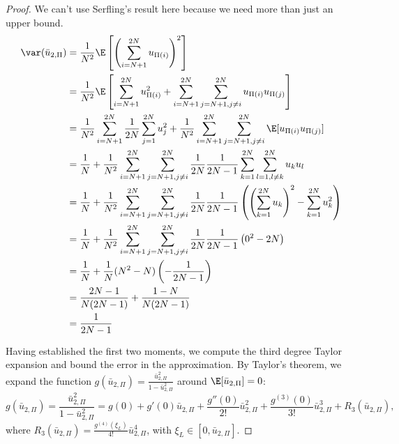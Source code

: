 \begin{proof}
  We can't use Serfling's result here because we need more than just an upper bound.
  \begin{align*}
    \var(\bar{u}_{2,\Pi})
    &= \frac{1}{N^2} \E \left [\left (\sum_{i=N+1}^{2N}u_{\Pi(i)}\right )^2\right ] \\
    &= \frac{1}{N^2} \E \left [\sum_{i=N+1}^{2N} u_{\Pi(i)}^2 +
    \sum_{i=N+1}^{2N}\sum_{j=N+1, j\neq i}^{2N}u_{\Pi(i)}u_{\Pi(j)} \right ] \\
    &= \frac{1}{N^2} \sum_{i=N+1}^{2N} \frac{1}{2N} \sum_{j=1}^{2N} u_{j}^2
    + \frac{1}{N^2}\sum_{i=N+1}^{2N}\sum_{j=N+1, j\neq
      i}^{2N} \E[u_{\Pi(i)} u_{\Pi(j)}] \\
    &= \frac{1}{N} + \frac{1}{N^2}\sum_{i=N+1}^{2N}\sum_{j=N+1, j\neq
      i}^{2N} \frac{1}{2N}\frac{1}{2N-1}\sum_{k=1}^{2N}
    \sum_{l=1, l\neq k}^{2N} u_ku_l \\
    &= \frac{1}{N} + \frac{1}{N^2}\sum_{i=N+1}^{2N}\sum_{j=N+1, j\neq
      i}^{2N} \frac{1}{2N}\frac{1}{2N-1} \left (
    \left (\sum_{k=1}^{2N} u_k \right )^2 - \sum_{k=1}^{2N} u_k^2
  \right ) \\
    &= \frac{1}{N} + \frac{1}{N^2}\sum_{i=N+1}^{2N}\sum_{j=N+1, j\neq
      i}^{2N} \frac{1}{2N}\frac{1}{2N-1} \left (
    0^2 - 2N \right ) \\
    &= \frac{1}{N} + \frac{1}{N}(N^2-N)\left (-\frac{1}{2N-1}\right ) \\
    &= \frac{2N-1}{N(2N-1)} + \frac{1-N}{N(2N-1)} \\
    &= \frac{1}{2N-1}
  \end{align*}

  Having established the first two moments, we compute the third degree Taylor expansion and bound
  the error in the approximation. By Taylor's theorem, we expand the function $g(\bar{u}_{2,\Pi}) =
  \frac{\bar{u}_{2,\Pi}^2}{1-\bar{u}_{2,\Pi}^2}$ around $\E[\bar{u}_{2,\Pi}] = 0$:
  \begin{equation*}
    g(\bar{u}_{2,\Pi}) = \frac{\bar{u}_{2,\Pi}^2}{1-\bar{u}_{2,\Pi}^2} = g(0) + g'(0)
    \bar{u}_{2,\Pi} + \frac{g''(0)}{2!}\bar{u}_{2,\Pi}^2 +
    \frac{g^{(3)}(0)}{3!}\bar{u}_{2,\Pi}^3 + R_3(\bar{u}_{2,\Pi}),
  \end{equation*}
  where $R_3(\bar{u}_{2,\Pi}) = \frac{g^{(4)}(\xi_L)}{4!}\bar{u}_{2,\Pi}^4$, with
  $\xi_L \in [0, \bar{u}_{2,\Pi}]$.


\end{proof}

